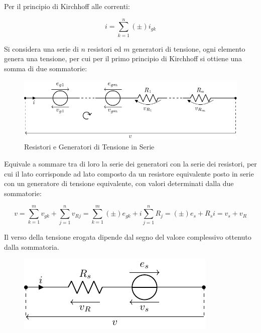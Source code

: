 \documentclass{article}
\numberwithin{equation}{subsection}
\begin{document}
Per il principio di Kirchhoff alle correnti:

\begin{equation*}
    i=\displaystyle\sum_{k=1}^n(\pm)i_{gk}
\end{equation*}


Si considera una serie di $n$ resistori ed $m$ generatori di tensione, ogni elemento genera una tensione, per cui per il primo principio di Kirchhoff si ottiene una somma 
di due sommatorie: 

\begin{figure}[H]%
    \centering
    \includegraphics{generatore-tensione-resistori-serie.pdf}%
    \caption{Resistori e Generatori di Tensione in Serie}%
    \label{fig:generatore-tensione-resistori-serie}
\end{figure}


Equivale a sommare tra di loro la serie dei generatori con la serie dei resistori, per cui il lato corrisponde ad lato composto da un resistore equivalente posto in serie 
con un generatore di tensione equivalente, con valori determinati dalla due sommatorie:

\begin{equation*}
    v=\displaystyle\sum_{k=1}^mv_{gk}+\sum_{j=1}^nv_{Rj}=\sum_{k=1}^m(\pm)e_{gk}+i\sum_{j=1}^nR_j=(\pm)e_{s}+R_si=v_{s}+v_R
\end{equation*}

Il verso della tensione erogata dipende dal segno del valore complessivo ottenuto dalla sommatoria. 

\begin{figure}[H]%
    \centering
    \includegraphics{generatore-tensione-resistori-serie-equivalente.pdf}%
    \label{fig:generatore-tensione-resistori-serie-equivalente}
\end{figure}
\end{document}
